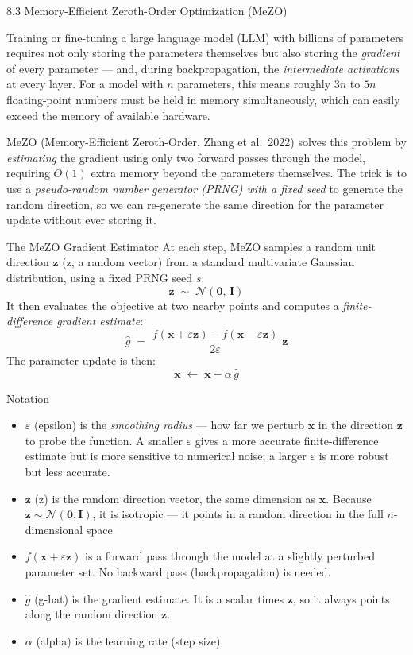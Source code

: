 \documentclass[aspectratio=169,10pt]{beamer}
\begin{document}
\begin{frame}[allowframebreaks]{8.3 Memory-Efficient Zeroth-Order Optimization (MeZO)}

Training or fine-tuning a large language model (LLM) with billions of parameters requires not only storing the parameters themselves but also storing the \emph{gradient} of every parameter --- and, during backpropagation, the \emph{intermediate activations} at every layer.
For a model with $n$ parameters, this means roughly $3n$ to $5n$ floating-point numbers must be held in memory simultaneously, which can easily exceed the memory of available hardware.

MeZO (Memory-Efficient Zeroth-Order, Zhang et al.\ 2022) solves this problem by \emph{estimating} the gradient using only two forward passes through the model, requiring $O(1)$ extra memory beyond the parameters themselves.
The trick is to use a \emph{pseudo-random number generator (PRNG) with a fixed seed} to generate the random direction, so we can re-generate the same direction for the parameter update without ever storing it.

\begin{block}{The MeZO Gradient Estimator}
At each step, MeZO samples a random unit direction $\mathbf{z}$ (z, a random vector) from a standard multivariate Gaussian distribution, using a fixed PRNG seed $s$:
\[
  \mathbf{z} \;\sim\; \mathcal{N}(\mathbf{0},\, \mathbf{I})
\]
It then evaluates the objective at two nearby points and computes a \emph{finite-difference gradient estimate}:
\[
  \hat{g} \;=\; \frac{f(\mathbf{x} + \varepsilon\mathbf{z}) - f(\mathbf{x} - \varepsilon\mathbf{z})}{2\varepsilon}\;\mathbf{z}
\]
The parameter update is then:
\[
  \mathbf{x} \;\leftarrow\; \mathbf{x} - \alpha\,\hat{g}
\]
\end{block}

\begin{block}{Notation}
\begin{itemize}
  \item $\varepsilon$ (epsilon) is the \emph{smoothing radius} --- how far we perturb $\mathbf{x}$ in the direction $\mathbf{z}$ to probe the function. A smaller $\varepsilon$ gives a more accurate finite-difference estimate but is more sensitive to numerical noise; a larger $\varepsilon$ is more robust but less accurate.
  \item $\mathbf{z}$ (z) is the random direction vector, the same dimension as $\mathbf{x}$. Because $\mathbf{z} \sim \mathcal{N}(\mathbf{0}, \mathbf{I})$, it is isotropic --- it points in a random direction in the full $n$-dimensional space.
  \item $f(\mathbf{x} + \varepsilon\mathbf{z})$ is a forward pass through the model at a slightly perturbed parameter set. No backward pass (backpropagation) is needed.
  \item $\hat{g}$ (g-hat) is the gradient estimate. It is a scalar times $\mathbf{z}$, so it always points along the random direction $\mathbf{z}$.
  \item $\alpha$ (alpha) is the learning rate (step size).
\end{itemize}
\end{block}


\end{frame}
\end{document}
